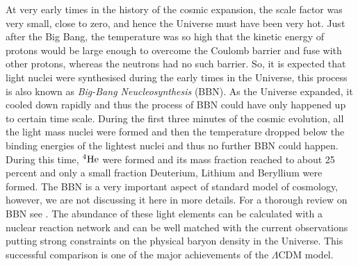 At  very early times in the history of the cosmic expansion, the scale factor 
was very small, close to zero, and hence the Universe must have been very hot. Just
after the Big Bang, the temperature was so high that the kinetic energy
of protons would be large enough to overcome the Coulomb barrier and fuse with other
protons, whereas the neutrons had no such barrier. So, it is expected that
light nuclei were synthesised during the early times in the Universe, this
process is also known as {\it Big-Bang Neucleosynthesis} (BBN). 
As the Universe expanded, 
it cooled down rapidly and thus the process of BBN could have only
happened up to certain time scale. During the first three minutes of the cosmic
evolution, all the light mass nuclei were formed and then the temperature
dropped below the binding energies of the lightest nuclei and thus no
further BBN could happen. During this time, $^4{\rm He}$ were formed and 
its mass fraction reached to about 25 percent and only a small fraction 
Deuterium, Lithium and Beryllium were formed. 
The BBN is a very important
aspect of standard model of cosmology, however, we are not discussing it here in more
details. For a thorough review on BBN
see \cite{2000PhST...85...12T,2006astro.ph..1514F}. The abundance of these light elements 
can be calculated with a nuclear reaction network and can be well matched
with the current observations putting strong constraints on the physical
baryon density in the Universe. This successful comparison is one of the major
achievements of the $\Lambda$CDM model.

